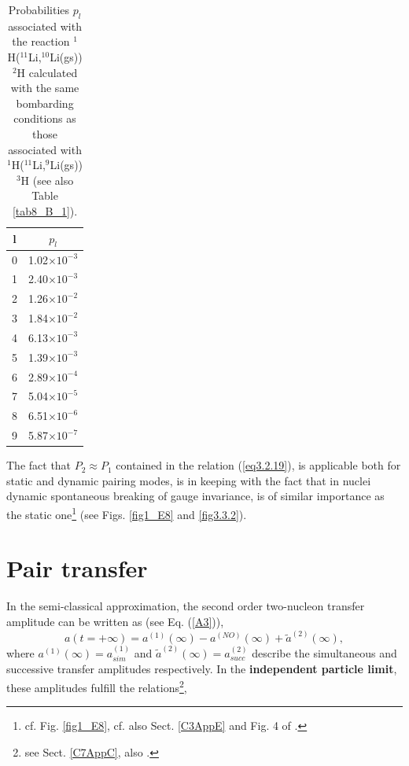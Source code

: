   \begin{table}
  \begin{tabular}{|c|c|}
  \hline  l & $p_l$ \\ 
\hline  0 & 1.02$\times 10^{-3}$ \\ 
\hline  1 & 2.40$\times 10^{-3}$ \\ 
\hline  2 &  1.26$\times 10^{-2}$ \\ 
\hline  3 &  1.84$\times 10^{-2}$ \\ 
\hline  4 &  6.13$\times 10^{-3}$\\ 
\hline  5 &  1.39$\times 10^{-3}$\\ 
\hline  6 &  2.89$\times 10^{-4}$\\ 
\hline  7 &  5.04$\times 10^{-5}$\\ 
\hline  8 &  6.51$\times 10^{-6}$\\ 
\hline  9 &  5.87$\times 10^{-7}$\\
\hline
  \end{tabular}\caption{Probabilities $p_l$  associated with the reaction $^1$H($^{11}$Li,$^{10}$Li(gs))$^2$H calculated with the same bombarding conditions as those associated with $^1$H($^{11}$Li,$^{9}$Li(gs))$^3$H (see also Table \ref{tab8_B_1}).}\label{tab3.3.1}
  \end{table}

 The fact that $P_2\approx P_1$  contained in the relation (\ref{eq3.2.19}), is applicable both for static and dynamic pairing modes, is  in keeping with the fact that in nuclei dynamic spontaneous breaking of gauge invariance, is of similar importance as the static one\footnote{cf. Fig. \ref{fig1_E8}, cf. also Sect. \ref{C3AppE} and Fig. 4 of \cite{Potel:13b}.} (see Figs. \ref{fig1_E8} and \ref{fig3.3.2}). 








\section{Pair transfer}\label{trans_nutAppA}
In the semi-classical approximation, the second order two-nucleon transfer amplitude can be written as (see Eq. (\ref{A3})), 
\begin{equation}\label{eq.4.5.1x}
a(t = + \infty) = a^{(1)}(\infty) - a^{(NO)}(\infty) + \tilde a^{(2)} ( \infty),
\end{equation}
where $a^{(1)}(\infty)=a^{(1)}_{sim}$ and $\tilde a^{(2)} (\infty)=a^{(2)}_{succ}$ describe the simultaneous and successive transfer amplitudes respectively.
   In the \textbf{independent particle limit}, these amplitudes fulfill the relations\footnote{see Sect. \ref{C7AppC}, also \cite{Potel:13}.},





